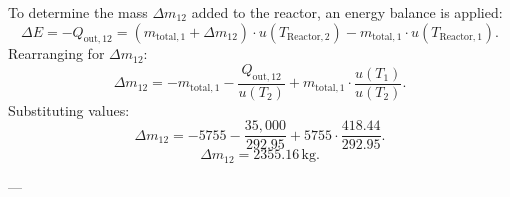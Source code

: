 To determine the mass \( \Delta m_{12} \) added to the reactor, an energy balance is applied:  
\[
\Delta E = -Q_{\text{out},12} = (m_{\text{total},1} + \Delta m_{12}) \cdot u(T_{\text{Reactor},2}) - m_{\text{total},1} \cdot u(T_{\text{Reactor},1}).
\]  
Rearranging for \( \Delta m_{12} \):  
\[
\Delta m_{12} = -m_{\text{total},1} - \frac{Q_{\text{out},12}}{u(T_2)} + m_{\text{total},1} \cdot \frac{u(T_1)}{u(T_2)}.
\]  
Substituting values:  
\[
\Delta m_{12} = -5755 - \frac{35,000}{292.95} + 5755 \cdot \frac{418.44}{292.95}.
\]  
\[
\Delta m_{12} = 2355.16 \, \text{kg}.
\]

---